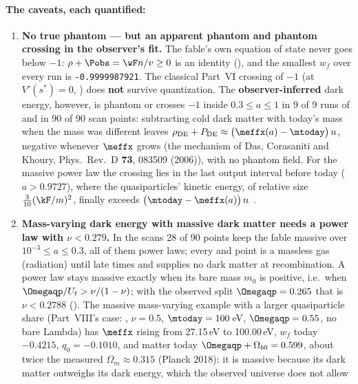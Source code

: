 \paragraph{The caveats, each quantified:}
\begin{enumerate}
  \item \textbf{No true phantom --- but an apparent phantom and phantom crossing in the observer's fit.} The
        fable's own equation of state never goes below $-1$: $\rho+\Pobs=\wF n/v\geq0$ is an identity
        (), and the smallest $w_f$ over every run is \texttt{-0.9999987921}. The classical
        Part~VI crossing of $-1$ (at $V'(s^*)=0$, ) does \textbf{not} survive quantization.
        The \textbf{observer-inferred} dark energy, however, is phantom or crosses $-1$ inside $0.3\leq a\leq1$
        in 9 of 9 runs of  and in 90 of 90 scan points: subtracting cold dark matter with
        today's mass when the mass was different leaves
        $\rho_{\mathrm{DE}}+P_{\mathrm{DE}}\approx\bigl(\meffx(a)-\mtoday\bigr)\,n$, negative whenever $\meffx$
        grows (the mechanism of Das, Corasaniti and Khoury, Phys.\ Rev.\ D \textbf{73}, 083509 (2006)), with no
        phantom field. For the massive power law the crossing lies in the last output interval before today
        ($a>0.9727$), where the quasiparticles' kinetic energy, of relative size $\tfrac{3}{10}(\kF/m)^2$, finally
        exceeds $\bigl(\mtoday-\meffx(a)\bigr)\,n$ .
  \item \textbf{Mass-varying dark energy with massive dark matter needs a power law with $\nu<0.279$.} In the
        scans 28 of 90 points keep the fable massive over $10^{-3}\leq a\leq0.3$, all of them power laws; every
         and  point is a massless gas (radiation) until late times and supplies
        no dark matter at recombination. A power law stays massive exactly when its bare mass $m_0$ is positive,
        i.e.\ when $\Omegaqp/U_t>\nu/(1-\nu)$; with the observed split $\Omegaqp=0.265$ that is $\nu<0.2788$
        (). The massive mass-varying example with a larger quasiparticle share (Part~VIII's
        case: , $\nu=0.5$, $\mtoday=100$\,eV, $\Omegaqp=0.55$, no bare Lambda) has $\meffx$ rising
        from 27.15\,eV to 100.00\,eV, $w_f$ today $-0.4215$, $q_0=-0.1010$, and matter today
        $\Omegaqp+\Omega_{b0}=0.599$, about twice the measured $\Omega_m\approx0.315$ (Planck 2018): it is
        massive because its dark matter outweighs its dark energy, which the observed universe does not allow

\end{enumerate}
